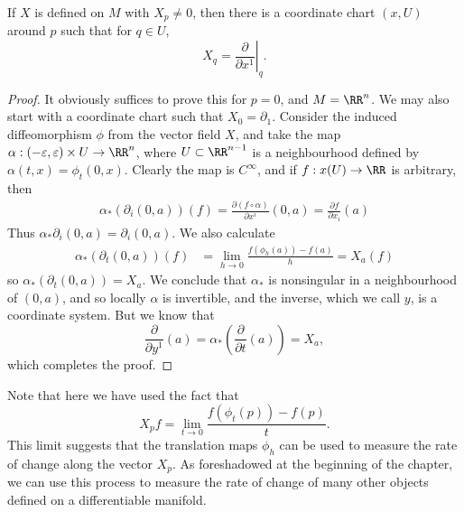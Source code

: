 \begin{theorem}
    If $X$ is defined on $M$ with $X_p \neq 0$, then there is a coordinate chart $(x,U)$ around $p$ such that for $q \in U$,
    \[ X_q = \left. \frac{\partial}{\partial x^1} \right|_q. \]
\end{theorem}
\begin{proof}
    It obviously suffices to prove this for $p = 0$, and $M = \RR^n$. We may also start with a coordinate chart such that $X_0 = \partial_1$. Consider the induced diffeomorphism $\phi$ from the vector field $X$, and take the map $\alpha: (-\varepsilon, \varepsilon) \times U \to \RR^n$, where $U \subset \RR^{n-1}$ is a neighbourhood defined by $\alpha(t,x) = \phi_t(0,x)$. Clearly the map is $C^\infty$, and if $f: x(U) \to \RR$ is arbitrary, then
    \begin{align*}
        \alpha_* \left( \partial_i(0,a) \right)(f) = \frac{\partial (f \circ \alpha)}{\partial x^i} (0,a) = \frac{\partial f}{\partial x_i}(a)
    \end{align*}
    Thus $\alpha_* \partial_i(0,a) = \partial_i(0,a)$. We also calculate
    \begin{align*}
        \alpha_* \left( \partial_t(0,a) \right) (f) &= \lim_{h \to 0} \frac{f(\phi_{h}(a)) - f(a)}{h} = X_a(f)
    \end{align*}
    so $\alpha_*(\partial_t(0,a)) = X_a$. We conclude that $\alpha_*$ is nonsingular in a neighbourhood of $(0,a)$, and so locally $\alpha$ is invertible, and the inverse, which we call $y$, is a coordinate system. But we know that
    \[ \frac{\partial}{\partial y^1}(a) = \alpha_* \left( \frac{\partial}{\partial t}(a) \right) = X_a, \]
    which completes the proof.
\end{proof}

Note that here we have used the fact that
%
\[ X_p f = \lim_{t \to 0} \frac{f(\phi_t(p)) - f(p)}{t}. \]
%
This limit suggests that the translation maps $\phi_h$ can be used to measure the rate of change along the vector $X_p$. As foreshadowed at the beginning of the chapter, we can use this process to measure the rate of change of many other objects defined on a differentiable manifold.


